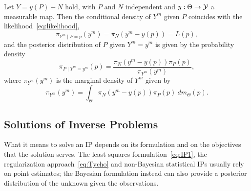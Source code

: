 \begin{thm}
    Let $Y = y(P) + N$ hold, with $P$ and $N$ independent and $y: \Theta \rightarrow \mathcal Y$ a measurable map.
    Then the conditional density of $Y^m$ given $P$ coincides with the likelihood~\eqref{eq:likelihood}, \[
        \pi_{Y^m\mid P = p}(y^m) = \pi_{N}(y^m - y( p) ) = L(p),
    \] and the posterior distribution of $P$ given $Y^m=y^m$ is given by the probability density \begin{equation}\label{eq:Bayes}
        \pi_{P\mid Y^m = y^m}(p) = \frac{\pi_{N}(y^m - y( p) ) \pi_P(p)}{\pi_{Y^m}(y^m)},
    \end{equation}
    where $\pi_{Y^m}(y^m)$ is the marginal density of $Y^m$ given by
    \[
        \pi_{Y^m}(y^m) = \int_\Theta  \pi_{N}(y^m - y( p) ) \pi_P(p) \ dm_\Theta(p).
    \]
\end{thm}

\subsection{Solutions of Inverse Problems}\label{sec:IP-sol}

What it means to solve an IP depends on its formulation and on the objectives that the solution serves.   
The least-squares formulation~\eqref{eq:IP1}, the regularization approach~\eqref{eq:Tycho} and non-Bayesian statistical IPs usually rely on point estimates; the Bayesian formulation instead can also provide a posterior distribution of the unknown given the observations. \medskip

